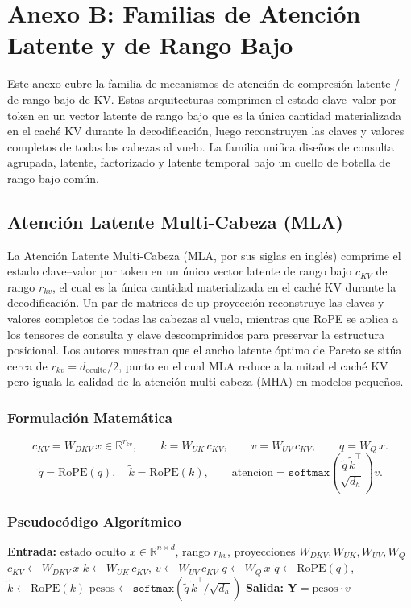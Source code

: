 \section{Anexo B: Familias de Atención Latente y de Rango Bajo}
\label{sec:annex-latent}

Este anexo cubre la familia de mecanismos de atención de compresión latente / de rango bajo de KV. Estas arquitecturas comprimen el estado clave--valor por token en un vector latente de rango bajo que es la única cantidad materializada en el caché KV durante la decodificación, luego reconstruyen las claves y valores completos de todas las cabezas al vuelo. La familia unifica diseños de consulta agrupada, latente, factorizado y latente temporal bajo un cuello de botella de rango bajo común.

\subsection{Atención Latente Multi-Cabeza (MLA)}
La Atención Latente Multi-Cabeza (MLA, por sus siglas en inglés) \citep{mehta_mla_2025} comprime el estado clave--valor por token en un único vector latente de rango bajo $c_{KV}$ de rango $r_{kv}$, el cual es la única cantidad materializada en el caché KV durante la decodificación. Un par de matrices de up-proyección reconstruye las claves y valores completos de todas las cabezas al vuelo, mientras que RoPE se aplica a los tensores de consulta y clave descomprimidos para preservar la estructura posicional. Los autores muestran que el ancho latente óptimo de Pareto se sitúa cerca de $r_{kv} = d_{\text{oculto}} / 2$, punto en el cual MLA reduce a la mitad el caché KV pero iguala la calidad de la atención multi-cabeza (MHA) en modelos pequeños.

\subsubsection{Formulación Matemática}
\[
c_{KV} = W_{DKV}\, x \in \mathbb{R}^{r_{kv}}, \qquad
k = W_{UK}\, c_{KV}, \qquad
v = W_{UV}\, c_{KV}, \qquad
q = W_{Q}\, x.
\]
\[
\tilde q = \text{RoPE}(q), \quad \tilde k = \text{RoPE}(k), \qquad
\text{atencion} = \texttt{softmax}\!\left(\frac{\tilde q\, \tilde k^\top}{\sqrt{d_h}}\right) v.
\]

\subsubsection{Pseudocódigo Algorítmico}
\begin{algorithmic}[1]
\State \textbf{Entrada:} estado oculto $x \in \mathbb{R}^{n \times d}$, rango $r_{kv}$, proyecciones $W_{DKV}, W_{UK}, W_{UV}, W_{Q}$
\State $c_{KV} \gets W_{DKV}\, x$ 
\State $k \gets W_{UK}\, c_{KV}$, \quad $v \gets W_{UV}\, c_{KV}$ 
\State $q \gets W_{Q}\, x$
\State $\tilde q \gets \text{RoPE}(q)$, \quad $\tilde k \gets \text{RoPE}(k)$ 
\State $\text{pesos} \gets \texttt{softmax}(\tilde q\, \tilde k^\top / \sqrt{d_h})$
\State \textbf{Salida:} $\mathbf{Y} = \text{pesos} \cdot v$
\end{algorithmic}

